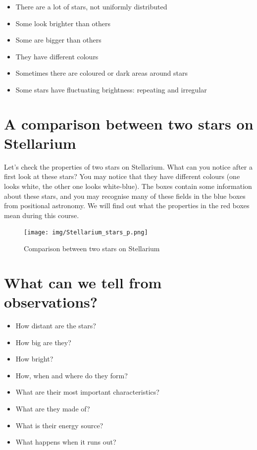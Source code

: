 \documentclass[
  letterpaper,
  DIV=11,
  numbers=noendperiod]{scrreprt}
\providecommand{\tightlist}{%
  \setlength{\itemsep}{0pt}\setlength{\parskip}{0pt}}\usepackage{longtable,booktabs,array}
\begin{document}
\begin{itemize}
\tightlist
\item
  There are a lot of stars, not uniformly distributed
\item
  Some look brighter than others
\item
  Some are bigger than others
\item
  They have different colours
\item
  Sometimes there are coloured or dark areas around stars
\item
  Some stars have fluctuating brightness: repeating and irregular
\end{itemize}

\hypertarget{a-comparison-between-two-stars-on-stellarium}{%
\section{A comparison between two stars on
Stellarium}\label{a-comparison-between-two-stars-on-stellarium}}

Let's check the properties of two stars on Stellarium. What can you
notice after a first look at these stars? You may notice that they have
different colours (one looks white, the other one looks white-blue). The
boxes contain some information about these stars, and you may recognise
many of these fields in the blue boxes from positional astronomy. We
will find out what the properties in the red boxes mean during this
course.

\begin{figure}

{\centering \texttt{[image: img/Stellarium\_stars\_p.png]}

}

\caption{Comparison between two stars on Stellarium}

\end{figure}

\hypertarget{what-can-we-tell-from-observations}{%
\section{What can we tell from
observations?}\label{what-can-we-tell-from-observations}}

\begin{itemize}
\tightlist
\item
  How distant are the stars?
\item
  How big are they?
\item
  How bright?
\item
  How, when and where do they form?
\item
  What are their most important characteristics?
\item
  What are they made of?
\item
  What is their energy source?
\item
  What happens when it runs out?
\end{itemize}
\end{document}
